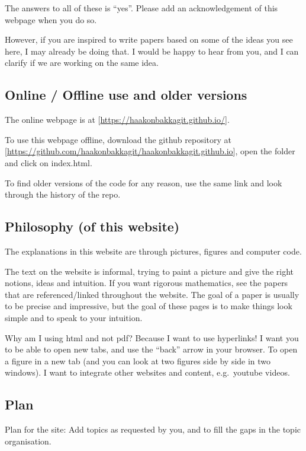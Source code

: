\documentclass[]{article}
\begin{document}
The answers to all of these is ``yes''. Please add an acknowledgement of
this webpage when you do so.

However, if you are inspired to write papers based on some of the ideas
you see here, I may already be doing that. I would be happy to hear from
you, and I can clarify if we are working on the same idea.

\hypertarget{online-offline-use-and-older-versions}{%
\subsection{Online / Offline use and older
versions}\label{online-offline-use-and-older-versions}}

The online webpage is at {[}\url{https://haakonbakkagit.github.io/}{]}.

To use this webpage offline, download the github repository at
{[}\url{https://github.com/haakonbakkagit/haakonbakkagit.github.io}{]},
open the folder and click on index.html.

To find older versions of the code for any reason, use the same link and
look through the history of the repo.

\hypertarget{philosophy-of-this-website}{%
\subsection{Philosophy (of this
website)}\label{philosophy-of-this-website}}

The explanations in this website are through pictures, figures and
computer code.

The text on the website is informal, trying to paint a picture and give
the right notions, ideas and intuition. If you want rigorous
mathematics, see the papers that are referenced/linked throughout the
website. The goal of a paper is usually to be precise and impressive,
but the goal of these pages is to make things look simple and to speak
to your intuition.

Why am I using html and not pdf? Because I want to use hyperlinks! I
want you to be able to open new tabs, and use the ``back'' arrow in your
browser. To open a figure in a new tab (and you can look at two figures
side by side in two windows). I want to integrate other websites and
content, e.g.~youtube videos.

\hypertarget{plan}{%
\subsection{Plan}\label{plan}}

Plan for the site: Add topics as requested by you, and to fill the gaps
in the topic organisation.
\end{document}
